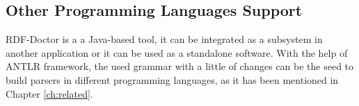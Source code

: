 \subsection{ Other Programming Languages Support}
RDF-Doctor is a  a Java-based tool, it can be integrated as a subsystem in another application or it can be used as a standalone software.  With the help of ANTLR framework, the used grammar with a little of changes can be the seed to build parsers in different programming languages, as it has been mentioned in Chapter \ref{ch:related}.    


